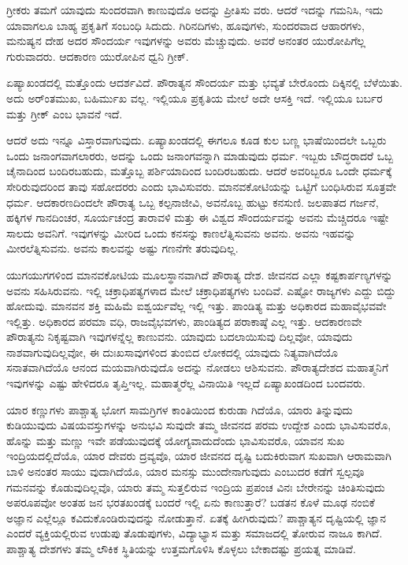ಗ್ರೀಕರು ತಮಗೆ ಯಾವುದು ಸುಂದರವಾಗಿ ಕಾಣುವುದೊ ಅದನ್ನು ಪ್ರೀತಿಸು ವರು. ಆದರೆ ಇದನ್ನು ಗಮನಿಸಿ, ಇದು ಯಾವಾಗಲೂ ಬಾಹ್ಯ ಪ್ರಕೃತಿಗೆ ಸಂಬಂಧಿ ಸಿದುದು. ಗಿರಿನದಿಗಳು, ಹೂವುಗಳು, ಸುಂದರವಾದ ಆಹಾರಗಳು, ಮನುಷ್ಯನ ದೇಹ ಅದರ ಸೌಂದರ್ಯ ಇವುಗಳನ್ನು ಅವರು ಮೆಚ್ಚುವುದು. ಅವರೆ ಅನಂತರ ಯುರೋಪಿಗೆಲ್ಲ ಗುರುವಾದರು. ಆದಕಾರಣ ಯುರೋಪಿನ ಧ್ವನಿ ಗ್ರೀಕ್.

ಏಷ್ಯಾಖಂಡದಲ್ಲಿ ಮತ್ತೊಂದು ಆದರ್ಶವಿದೆ. ಪೌರಾತ್ಯನ ಸೌಂದರ್ಯ ಮತ್ತು ಭವ್ಯತೆ ಬೇರೊಂದು ದಿಕ್ಕಿನಲ್ಲಿ ಬೆಳೆಯಿತು. ಅದು ಅರ್ಂತಮುಖ, ಬಹಿರ್ಮುಖ ವಲ್ಲ. ಇಲ್ಲಿಯೂ ಪ್ರಕೃತಿಯ ಮೇಲೆ ಅದೇ ಆಸಕ್ತಿ ಇದೆ. ಇಲ್ಲಿಯೂ ಬರ್ಬರ ಮತ್ತು ಗ್ರೀಕ್ ಎಂಬ ಭಾವನೆ ಇದೆ.

ಆದರೆ ಅದು ಇನ್ನೂ ವಿಸ್ತಾರವಾಗುವುದು. ಏಷ್ಯಾಖಂಡದಲ್ಲಿ ಈಗಲೂ ಕೂಡ ಕುಲ ಬಣ್ಣ ಭಾಷೆಯಿಂದಲೇ ಒಬ್ಬರು ಒಂದು ಜನಾಂಗವಾಗಲಾರರು, ಅದನ್ನು ಒಂದು ಜನಾಂಗವನ್ನಾಗಿ ಮಾಡುವುದು ಧರ್ಮ. ಇಬ್ಬರು ಬೌದ್ಧರಾದರೆ ಒಬ್ಬ ಚೈನಾದಿಂದ ಬಂದಿರಬಹುದು, ಮತ್ತೊಬ್ಬ ಪರ್ಶಿಯಾದಿಂದ ಬಂದಿರಬಹುದು. ಆದರೆ ಅವರಿಬ್ಬರೂ ಒಂದೇ ಧರ್ಮಕ್ಕೆ ಸೇರಿರುವುದರಿಂದ ತಾವು ಸಹೋದರರು ಎಂದು ಭಾವಿಸುವರು. ಮಾನವಕೋಟಿಯನ್ನು ಒಟ್ಟಿಗೆ ಬಂಧಿಸಿರುವ ಸೂತ್ರವೇ ಧರ್ಮ. ಆದಕಾರಣದಿಂದಲೇ ಪೌರಾತ್ಯ ಒಬ್ಬ ಕಲ್ಪನಾಜೀವಿ, ಅವನೊಬ್ಬ ಹುಟ್ಟು ಕನಸುಣಿ. ಜಲಪಾತದ ಗರ್ಜನೆ, ಹಕ್ಕಿಗಳ ಗಾನದಿಂಚರ, ಸೂರ್ಯಚಂದ್ರ ತಾರಾವಳಿ ಮತ್ತು ಈ ವಿಶ್ವದ ಸೌಂದರ್ಯವನ್ನು ಅವನು ಮೆಚ್ಚಿದರೂ ಇಷ್ಟೇ ಸಾಲದು ಅವನಿಗೆ. ಇವುಗಳನ್ನು ಮೀರಿದ ಒಂದು ಕನಸನ್ನು ಕಾಣಲೆತ್ನಿಸುವನು ಅವನು. ಅವನು ಇಹವನ್ನು ಮೀರಲೆತ್ನಿಸುವನು. ಅವನು ಕಾಲವನ್ನು ಅಷ್ಟು ಗಣನೆಗೇ ತರುವುದಿಲ್ಲ.

ಯುಗಯುಗಗಳಿಂದ ಮಾನವಕೋಟಿಯ ಮೂಲಸ್ಥಾನವಾಗಿದೆ ಪೌರಾತ್ಯ ದೇಶ. ಜೀವನದ ಎಲ್ಲಾ ಕಷ್ಟಕಾರ್ಪಣ್ಯಗಳನ್ನು ಅವನು ಸಹಿಸಿರುವನು. ಇಲ್ಲಿ ಚಕ್ರಾಧಿಪತ್ಯಗಳಾದ ಮೇಲೆ ಚಕ್ರಾಧಿಪತ್ಯಗಳು ಬಂದಿವೆ. ಎಷ್ಟೋ ರಾಜ್ಯಗಳು ಎದ್ದು ಬಿದ್ದು ಹೋದುವು. ಮಾನವನ ಶಕ್ತಿ ಮಹಿಮೆ ಐಶ್ವರ್ಯವೆಲ್ಲ ಇಲ್ಲಿ ಇತ್ತು. ಪಾಂಡಿತ್ಯ ಮತ್ತು ಅಧಿಕಾರದ ಮಹಾವೈಭವವೇ ಇಲ್ಲಿತ್ತು. ಅಧಿಕಾರದ ಪರಮಾ ವಧಿ, ರಾಜವೈಭವಗಳು, ಪಾಂಡಿತ್ಯದ ಪರಾಕಾಷ್ಠೆ ಎಲ್ಲ ಇತ್ತು. ಆದಕಾರಣವೇ ಪೌರಾತ್ಯನು ನಿಕೃಷ್ಟವಾಗಿ ಇವುಗಳನ್ನೆಲ್ಲ ಕಾಣುವನು. ಯಾವುದು ಬದಲಾಯಿಸುವು ದಿಲ್ಲವೋ, ಯಾವುದು ನಾಶವಾಗುವುದಿಲ್ಲವೋ, ಈ ದುಃಖಸಾವುಗಳಿಂದ ತುಂಬಿದ ಲೋಕದಲ್ಲಿ ಯಾವುದು ನಿತ್ಯವಾಗಿದೆಯೊ ಸನಾತವಾಗಿದೆಯೊ ಆನಂದ ಮಯವಾಗಿರುವುದೊ ಅದನ್ನು ನೋಡಲು ಆಶಿಸುವನು. ಪೌರಾತ್ಯದೇಶದ ಮಹಾತ್ಮನಿಗೆ ಇವುಗಳನ್ನು ಎಷ್ಟು ಹೇಳಿದರೂ ತೃಪ್ತಿಇಲ್ಲ. ಮಹಾತ್ಮರೆಲ್ಲ ವಿನಾಯಿತಿ ಇಲ್ಲದೆ ಏಷ್ಯಾಖಂಡದಿಂದ ಬಂದವರು.

ಯಾರ ಕಣ್ಣುಗಳು ಪಾಶ್ಚಾತ್ಯ ಭೋಗ ಸಾಮಗ್ರಿಗಳ ಕಾಂತಿಯಿಂದ ಕುರುಡಾ ಗಿದೆಯೊ, ಯಾರು ತಿನ್ನುವುದು ಕುಡಿಯುವುದು ವಿಷಯವಸ್ತುಗಳನ್ನು ಅನುಭವಿ ಸುವುದೇ ತಮ್ಮ ಜೀವನದ ಪರಮ ಉದ್ದೇಶ ಎಂದು ಭಾವಿಸುವರೊ, ಹೊನ್ನು ಮತ್ತು ಮಣ್ಣು ಇವೇ ಪಡೆಯುವುದಕ್ಕೆ ಯೋಗ್ಯವಾದುದೆಂದು ಭಾವಿಸುವರೊ, ಯಾವನ ಸುಖ ಇಂದ್ರಿಯದಲ್ಲಿದೆಯೊ, ಯಾರ ದೇವರು ದ್ರವ್ಯವೊ, ಯಾರ ಜೀವನದ ದೃಷ್ಟಿ ಬದುಕಿರುವಾಗ ಸುಖವಾಗಿ ಆರಾಮವಾಗಿ ಬಾಳಿ ಅನಂತರ ಸಾಯು ವುದಾಗಿದೆಯೊ, ಯಾರ ಮನಸ್ಸು ಮುಂದೇನಾಗುವುದು ಎಂಬುದರ ಕಡೆಗೆ ಸ್ವಲ್ಪವೂ ಗಮನವನ್ನು ಕೊಡುವುದಿಲ್ಲವೊ, ಯಾರು ತಮ್ಮ ಸುತ್ತಲಿರುವ ಇಂದ್ರಿಯ ಪ್ರಪಂಚ ವಿನಃ ಬೇರೇನನ್ನು ಚಿಂತಿಸುವುದು ಅಪರೂಪವೋ ಅಂತಹ ಜನ ಭರತಖಂಡಕ್ಕೆ ಬಂದರೆ ಇಲ್ಲಿ ಏನು ಕಾಣುತ್ತಾರೆ? ಬಡತನ ಕೊಳೆ ಮೂಢ ನಂಬಿಕೆ ಅಜ್ಞಾನ ಎಲ್ಲೆಲ್ಲೂ ಕವಿದುಕೊಂಡಿರುವುದನ್ನು ನೋಡುತ್ತಾನೆ. ಏತಕ್ಕೆ ಹೀಗಿರುವುದು? ಪಾಶ್ಚಾತ್ಯನ ದೃಷ್ಟಿಯಲ್ಲಿ ಜ್ಞಾನ ಎಂದರೆ ವ್ಯಕ್ತಿಯಲ್ಲಿರುವ ಉಡುಪು ತೊಡುಪುಗಳು, ವಿದ್ಯಾಭ್ಯಾಸ ಮತ್ತು ಸಮಾಜದಲ್ಲಿ ತೋರುವ ನಾಜೂ ಕಾಗಿದೆ. ಪಾಶ್ಚಾತ್ಯ ದೇಶಗಳು ತಮ್ಮ ಲೌಕಿಕ ಸ್ಥಿತಿಯನ್ನು ಉತ್ತಮಗೊಳಿಸಿ ಕೊಳ್ಳಲು ಬೇಕಾದಷ್ಟು ಪ್ರಯತ್ನ ಮಾಡಿವೆ.

